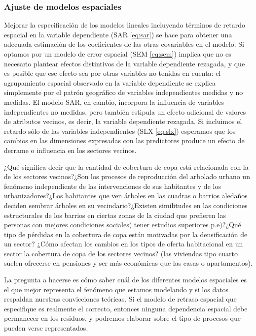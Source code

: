 \documentclass[12pt,]{book}
\begin{document}
\subsubsection{Ajuste de modelos
espaciales}\label{ajuste-de-modelos-espaciales}

Mejorar la especificación de los modelos lineales incluyendo términos de
retardo espacial en la variable dependiente (SAR \eqref{eq:sar}) se hace
para obtener una adecuada estimación de los coeficientes de las otras
covariables en el modelo. Si optamos por un modelo de error espacial
(SEM \eqref{eq:sem}) implica que no es necesario plantear efectos
distintivos de la variable dependiente rezagada, y que es posible que
ese efecto sea por otras variables no tenidas en cuenta: el agrupamiento
espacial observado en la variable dependiente se explica simplemente por
el patrón geográfico de variables independientes medidas y no medidas.
El modelo SAR, en cambio, incorpora la influencia de variables
independientes no medidas, pero también estipula un efecto adicional de
valores de atributos vecinos, es decir, la variable dependiente
rezagada. Si incluimos el retardo sólo de las variables independientes
(SLX \eqref{eq:slx}) esperamos que los cambios en las dimensiones
expresadas con las predictores produce un efecto de derrame o influencia
en los sectores vecinos.

¿Qué significa decir que la cantidad de cobertura de copa está
relacionada con la de los sectores vecinos?¿Son los procesos de
reproducción del arbolado urbano un fenómeno independiente de las
intervenciones de sus habitantes y de los urbanizadores?¿Los habitantes
que ven árboles en las cuadras o barrios aledaños deciden sembrar
árboles en su vecindario?¿Existen similitudes en las condiciones
estructurales de los barrios en ciertas zonas de la ciudad que prefieren
las personas con mejores condiciones sociales( tener estudios superiores
p.e)?¿Qué tipo de pérdidas en la cobertura de copa están motivadas por
la densificación de un sector? ¿Cómo afectan los cambios en los tipos de
oferta habitacional en un sector la cobertura de copa de los sectores
vecinos? (las viviendas tipo cuarto suelen ofrecerse en pensiones y ser
más económicas que las casas o apartamentos).

La pregunta a hacerse es cómo saber cuál de los diferentes modelos
espaciales es el que mejor representa el fenómeno que estamos modelando
y si los datos respaldan nuestras convicciones teóricas. Si el modelo de
retraso espacial que especifique es realmente el correcto, entonces
ninguna dependencia espacial debe permanecer en los residuos, y podremos
elaborar sobre el tipo de procesos que pueden verse representados.
\end{document}
